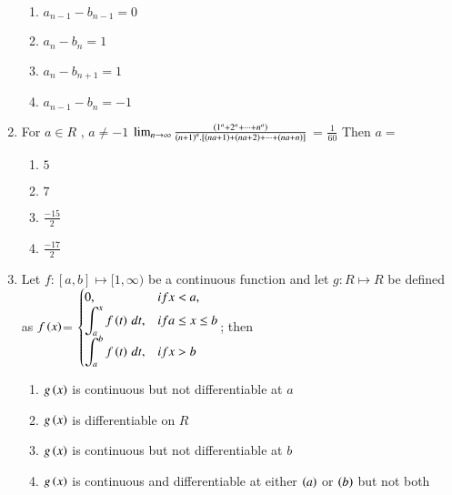 \documentclass[journal,12pt,twocolumn]{IEEEtran}
\theoremstyle{remark}
\begin{document}
\begin{enumerate}
    \hfill 
    {}
    
    \begin{enumerate}[label=(\alph*)]
        
        \item $a_{n-1}-b_{n-1}=0$ 
        \item $a_n-b_n=1$ 
        \item $a_n-b_{n+1}=1$ 
        \item $a_{n-1}-b_n=-1$ 
    \end{enumerate}


    \item 
    {For $a\in R$ , $a\neq -1$ 
    $\lim_{n\to\infty}\frac{\left(1^a+2^a+\cdots+n^a\right)}{\left(n+1\right)^a.[\left(na+1\right)+\left(na+2\right)+\cdots+\left(na+n\right)]}$ = $\frac{1}{60}$ Then $a=$ }

    \hfill 
    {}
    
    \begin{enumerate}[label=(\alph*)]
        
        \item $5$
        \item $7$ 
        \item $\frac{-15}{2}$ 
        \item $\frac{-17}{2}$ 
    \end{enumerate}


    \item 
    {Let $f: [a,b]\mapsto [1,\infty)$ be a continuous function and let $g: R\mapsto R$ be defined as 
    $f\left(x\right)$= 
    $\begin{cases}
       0, & if x<a, \\
       \displaystyle \int_{a}^{x}{f\left(t\right) \, dt}, & if a\leq x\leq b \\
       \displaystyle \int_{a}^{b}{f\left(t\right) \, dt}, & if x>b
    \end{cases}$; then} 

    \hfill 
    {}
    
    \begin{enumerate}[label=(\alph*)]
        
        \item $g\left(x\right)$ is continuous but not differentiable at $a$
        \item $g\left(x\right)$ is differentiable on $R$
        \item $g\left(x\right)$ is continuous but not differentiable at $b$
        \item $g\left(x\right)$ is continuous and differentiable at either $\left(a\right)$ or $\left(b\right)$ but not both 
    \end{enumerate}



\end{enumerate}
\end{document}
